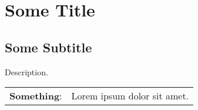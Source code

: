 \documentclass[../main]{subfiles}
\begin{document}
\clearpage

\section{Some Title}

\subsection{Some Subtitle}

Description.

\begin{tabular}{rp{10cm}}
\textbf{Something}: & Lorem ipsum dolor sit amet.	
\end{tabular}
\end{document}

